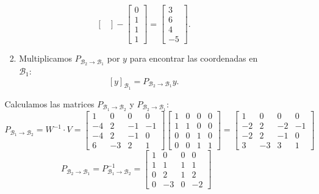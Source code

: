 \begin{enumerate}[label=\color{red}\textbf{\arabic*)}]
\begin{enumerate}[label=Paso \arabic*:]
\begin{enumerate}[label=\arabic*)]
\begin{enumerate}[label=\arabic*)]
\[\begin{bmatrix}
            \end{bmatrix} -\begin{bmatrix} 
            0\\1\\1\\1 
            \end{bmatrix} =\begin{bmatrix} 
            3\\6\\4\\-5 
            \end{bmatrix} .
            \] 
        \item Multiplicamos $P_{\mathcal{B}_2\to \mathcal{B}_1}$ por $y$ para encontrar las coordenadas en  $\mathcal{B}_1$: \[
                [y]_{\mathcal{B}_1}=P_{\mathcal{B}_2\to \mathcal{B}_1}y.
        \] 
        \end{enumerate}
        Calculamos las matrices $P_{\mathcal{B}_1\to \mathcal{B}_{2}}$ y $P_{\mathcal{B}_2\to \mathcal{B}_1}$: \[
        P_{\mathcal{B}_1\to \mathcal{B}_2}=W^{-1}\cdot V=\begin{bmatrix} 
            1 & 0 & 0 & 0\\
            -4 & 2 & -1 & -1\\
            -4 & 2 & -1 & 0\\
            6 & -3 & 2 & 1
        \end{bmatrix} \begin{bmatrix} 
            1 & 0 & 0 & 0\\
            1 & 1 & 0 & 0\\
            0 & 0 & 1 & 0\\
            0 & 0 & 1 & 1
        \end{bmatrix} =\begin{bmatrix} 
            1 & 0 & 0 & 0\\
            -2 & 2 & -2 & -1\\
            -2 & 2 & -1 & 0\\
            3 & -3 & 3 & 1
        \end{bmatrix} 
        \] 
        \[
        P_{\mathcal{B}_2\to \mathcal{B}_1}=P_{\mathcal{B}_1\to \mathcal{B}_2}^{-1}=\begin{bmatrix} 
            1 & 0 & 0 & 0\\
            1 & 1 & 1 & 1\\
            0 & 2 & 1 & 2\\
            0 & -3 & 0 & -2
        \end{bmatrix} 
\]
\end{enumerate}
\end{enumerate}
\end{enumerate}
